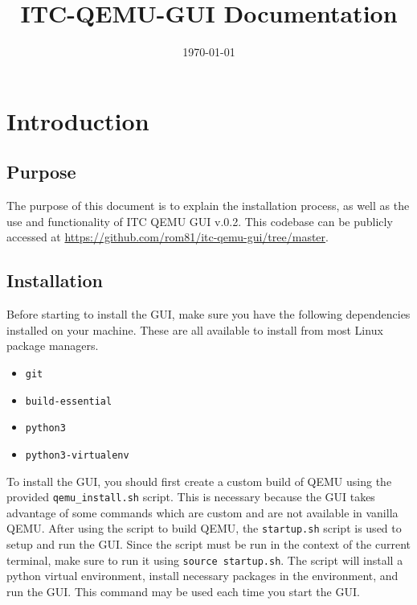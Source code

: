 \documentclass{article}
\title{ITC-QEMU-GUI \version{} Documentation}
\author{}
\date{\today}
\newcommand{\version}{v.0.2}
\newcommand{\code}[1]{\texttt{#1}}
\begin{document}
\maketitle
\tableofcontents



\begin{versionhistory}
\end{versionhistory}

\newpage

\section{Introduction}

\subsection{Purpose}
The purpose of this document is to explain the installation process, as well as the use and functionality of ITC QEMU GUI \version{}. This codebase can be publicly accessed at \url{https://github.com/rom81/itc-qemu-gui/tree/master}.

\subsection{Installation}
Before starting to install the GUI, make sure you have the following dependencies installed on your machine. These are all available to install from most Linux package managers.
\begin{itemize}
    \item \code{git}
    \item \code{build-essential}
    \item \code{python3}
    \item \code{python3-virtualenv}
\end{itemize}

To install the GUI, you should first create a custom build of QEMU using the provided \code{qemu\_install.sh} script. This is necessary because the GUI takes advantage of some commands which are custom and are not available in vanilla QEMU. After using the script to build QEMU, the \code{startup.sh} script is used to setup and run the GUI. Since the script must be run in the context of the current terminal, make sure to run it using \code{source startup.sh}. The script will install a python virtual environment, install necessary packages in the environment, and run the GUI. This command may be used each time you start the GUI.
\end{document}
